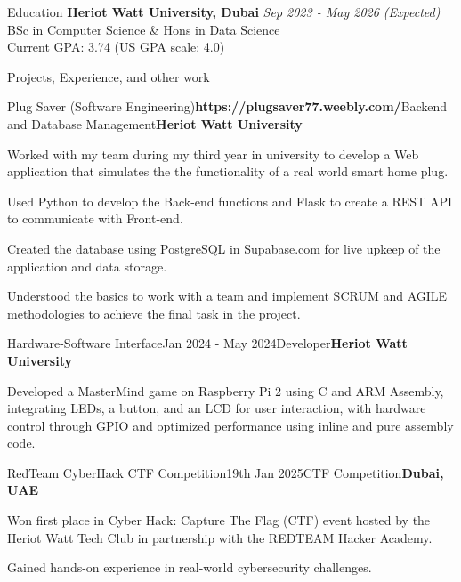 \documentclass{resume}
\begin{document}
  \begin{rSection}{Education}
    {\bf Heriot Watt University, Dubai} \hfill {\em Sep 2023 - May 2026 (Expected)} \\ 
    { BSc in Computer Science \& Hons in Data Science} \smallskip \\ 
    Current GPA: 3.74 (US GPA scale: 4.0)
  \end{rSection}
  
  \begin{rSection}{Projects, Experience, and other work}
  
    \begin{rSubsection}{Plug Saver (Software Engineering)}{\textbf{https://plugsaver77.weebly.com/}}{Backend and Database Management}{\textbf{Heriot Watt University}}
    \item Worked with my team during my third year in university to develop a Web application that simulates the the functionality of a real world smart home plug.
    \item Used Python to develop the Back-end functions and Flask to create a REST API to communicate with Front-end.
    \item Created the database using PostgreSQL in Supabase.com for live upkeep of the application and data storage.
    \item Understood the basics to work with a team and implement SCRUM and AGILE methodologies to achieve the final task in the project.
    \end{rSubsection}
  
    \begin{rSubsection}{Hardware-Software Interface}{Jan 2024 - May 2024}{Developer}{\textbf{Heriot Watt University}}
    \item Developed a MasterMind game on Raspberry Pi 2 using C and ARM Assembly, integrating LEDs, a button, and an LCD for user interaction, with hardware control through GPIO and optimized performance using inline and pure assembly code.
    \end{rSubsection}

    \begin{rSubsection}{RedTeam CyberHack CTF Competition}{19th Jan 2025}{CTF Competition}{\textbf{Dubai, UAE}}
    \item Won first place in Cyber Hack: Capture The Flag (CTF) event hosted by the Heriot Watt Tech Club in partnership with the REDTEAM Hacker Academy.
    \item Gained hands-on experience in real-world cybersecurity challenges.
    \end{rSubsection}


\end{rSection}
\end{document}
